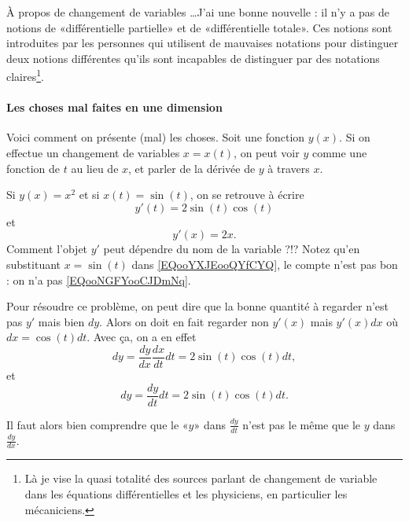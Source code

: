 \begin{normaltext}
    À propos de changement de variables \ldots J'ai une bonne nouvelle : il n'y a pas de notions de «différentielle partielle» et de «différentielle totale». Ces notions sont introduites par les personnes qui utilisent de mauvaises notations pour distinguer deux notions différentes qu'ils sont incapables de distinguer par des notations claires\footnote{Là je vise la quasi totalité des sources parlant de changement de variable dans les équations différentielles et les physiciens, en particulier les mécaniciens.}.
\end{normaltext}

\paragraph{Les choses mal faites en une dimension}

    Voici comment on présente (mal) les choses. Soit une fonction \( y(x)\). Si on effectue un changement de variables \( x=x(t)\), on peut voir \( y\) comme une fonction de \( t\) au lieu de \( x\), et parler de la dérivée de \( y\) à travers \( x\).

    Si \( y(x)=x^2\) et si \( x(t)=\sin(t)\), on se retrouve à écrire
    \begin{equation}        \label{EQooNGFYooCJDmNq}
        y'(t)=2\sin(t)\cos(t)
    \end{equation}
    et 
    \begin{equation}        \label{EQooYXJEooQYfCYQ}
        y'(x)=2x.
    \end{equation}
    Comment l'objet \( y'\) peut dépendre du nom de la variable ?!? Notez qu'en substituant \( x=\sin(t)\) dans \eqref{EQooYXJEooQYfCYQ}, le compte n'est pas bon : on n'a pas \eqref{EQooNGFYooCJDmNq}.

    Pour résoudre ce problème, on peut dire que la bonne quantité à regarder n'est pas \( y'\) mais bien \( dy\). Alors on doit en fait regarder non \( y'(x)\) mais \( y'(x)dx\) où \( dx=\cos(t)dt\). Avec ça, on a en effet
    \begin{equation}
        dy=\frac{ dy }{ dx }\frac{ dx }{ dt }dt=2\sin(t)\cos(t)dt,
    \end{equation}
    et
    \begin{equation}
        dy=\frac{ dy }{ dt }dt=2\sin(t)\cos(t)dt.
    \end{equation}
    
    Il faut alors bien comprendre que le «\( y\)» dans \( \frac{ dy }{ dt }\) n'est pas le même que le \( y\) dans \( \frac{ dy }{ dx }\).

